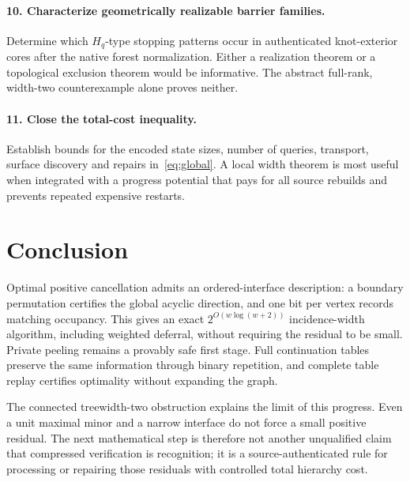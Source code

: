 \documentclass[11pt,a4paper]{article}
\theoremstyle{definition}
\theoremstyle{remark}
\begin{document}
\paragraph{10. Characterize geometrically realizable barrier families.}
Determine which $H_q$-type stopping patterns occur in authenticated
knot-exterior cores after the native forest normalization. Either a
realization theorem or a topological exclusion theorem would be informative.
The abstract full-rank, width-two counterexample alone proves neither.

\paragraph{11. Close the total-cost inequality.}
Establish bounds for the encoded state sizes, number of queries, transport,
surface discovery and repairs in~\eqref{eq:global}. A local width theorem
is most useful when integrated with a progress potential that pays for
all source rebuilds and prevents repeated expensive restarts.

\section{Conclusion}
Optimal positive cancellation admits an ordered-interface description:
a boundary permutation certifies the global acyclic direction, and one
bit per vertex records matching occupancy. This gives an exact
$2^{O(w\log(w+2))}$ incidence-width algorithm, including weighted deferral,
without requiring the residual to be small. Private peeling remains a
provably safe first stage. Full continuation tables preserve the same
information through binary repetition, and complete table replay certifies
optimality without expanding the graph.

The connected treewidth-two obstruction explains the limit of this
progress. Even a unit maximal minor and a narrow interface do not force a
small positive residual. The next mathematical step is therefore not
another unqualified claim that compressed verification is recognition; it
is a source-authenticated rule for processing or repairing those residuals
with controlled total hierarchy cost.

\appendix
\end{document}
